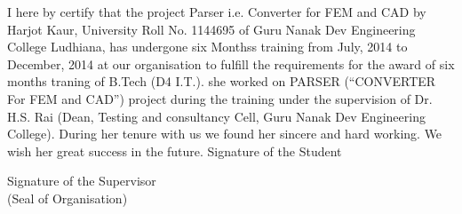 \begin{Large}
\end{Large}
I here by certify that the  project  Parser i.e. Converter for FEM and CAD by Harjot Kaur, University Roll No. 1144695  of Guru Nanak Dev Engineering College Ludhiana, has undergone six Monthss training from July, 2014 to December,
2014 at our organisation to fulfill the requirements for the award of six months traning
of B.Tech (D4 I.T.). she worked on PARSER (“CONVERTER For FEM and CAD”) project
during the training under the supervision of Dr. H.S. Rai (Dean, Testing and consultancy
Cell, Guru Nanak Dev Engineering College). During her tenure with us we found her
sincere and hard working. We wish her great success in the future.
\vskip 2.0cm
Signature of the Student\\
\author {Harjot Kaur}
\vskip 2.0cm
Signature of the Supervisor\\
\vskip 2.0cm
(Seal of Organisation)

